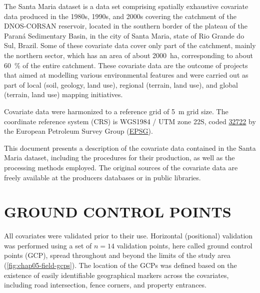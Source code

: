 The Santa Maria dataset is a data set comprising spatially exhaustive covariate data produced in the 1980s, 
1990s, and 2000s covering the catchment of the DNOS-CORSAN reservoir, located in the southern border of the 
plateau of the Paraná Sedimentary Basin, in the city of Santa Maria, state of Rio Grande do Sul, Brazil. Some 
of these covariate data cover only part of the catchment, mainly the northern sector, which has an area of 
about
\SI{2000}{\hectare}, corresponding to about \SI{60}{\percent} of the entire catchment. These covariate data 
are the outcome of projects that aimed at modelling various environmental features and were carried out as 
part of local (soil, geology, land use), regional (terrain, land use), and global (terrain, land use) mapping 
initiatives.

Covariate data were harmonized to a reference grid of \SI{5}{\m} grid size. The coordinate reference 
system (CRS) is WGS1984 / UTM zone 22S, coded \href{http://spatialreference.org/ref/epsg/32722/}{\num{32722}} 
by the European Petroleum Survey Group (\href{http://www.epsg.org/}{EPSG}).

This document presents a description of the covariate data contained in the Santa Maria dataset, including the
procedures for their production, as well as the processing methods employed. The original sources of the 
covariate data are freely available at the producers databases or in public libraries.

\section{GROUND CONTROL POINTS}
\label{sec:chap05-gcp}

All covariates were validated prior to their use. Horizontal (positional) validation was performed using a set
of $n = 14$ validation points, here called ground control points (GCP), spread throughout and beyond the 
limits of the study area (\autoref{fig:chap05-field-gcps}). The location of the GCPs was defined based on 
the existence of easily identifiable geographical markers across the covariates, including road intersection, 
fence corners, and property entrances.

